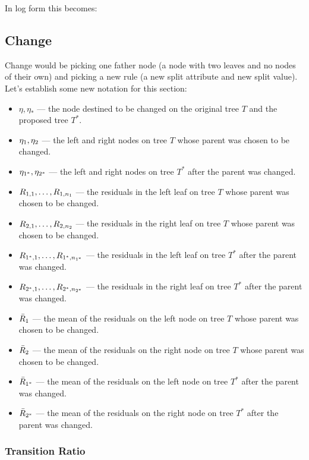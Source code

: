 In log form this becomes:


\subsection*{Change}

Change would be picking one father node (a node with two leaves and no nodes of their own) and picking a new rule (\ie a new split attribute and new split value). Let's establish some new notation for this section:


\begin{itemize}
\item $\eta, \eta_*$ --- the node destined to be changed on the original tree $T$ and the proposed tree $T^*$.
\item $\eta_1, \eta_2$ --- the left and right nodes on tree $T$ whose parent was chosen to be changed.
\item $\eta_{1^*}, \eta_{2^*}$ --- the left and right nodes on tree $T^*$ after the parent was changed.
\item $R_{1,1}, \ldots, R_{1, n_{1}}$ --- the residuals in the left leaf on tree $T$ whose parent was chosen to be changed.
\item $R_{2,1}, \ldots, R_{2, n_{2}}$ --- the residuals in the right leaf on tree $T$ whose parent was chosen to be changed.
\item $R_{1^*,1}, \ldots, R_{1^*, n_{1^*}}$ --- the residuals in the left leaf on tree $T^*$ after the parent was changed.
\item $R_{2^*,1}, \ldots, R_{2^*, n_{2^*}}$ --- the residuals in the right leaf on tree $T^*$ after the parent was changed.
\item $\bar{R}_1$ --- the mean of the residuals on the left node on tree $T$ whose parent was chosen to be changed.
\item $\bar{R}_2$ --- the mean of the residuals on the right node on tree $T$ whose parent was chosen to be changed.
\item $\bar{R}_{1^*}$ --- the mean of the residuals on the left node on tree $T^*$ after the parent was changed.
\item $\bar{R}_{2^*}$ --- the mean of the residuals on the right node on tree $T^*$ after the parent was changed.
\end{itemize}

\subsubsection*{Transition Ratio}

